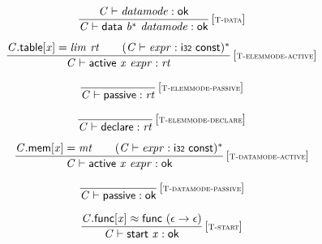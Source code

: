$$
\begin{array}{@{}c@{}}\displaystyle
\frac{
{\mathit{C}} \vdash {\mathit{datamode}} : \mathsf{ok}
}{
{\mathit{C}} \vdash \mathsf{data}~{{\mathit{b}}^\ast}~{\mathit{datamode}} : \mathsf{ok}
} \, {[\textsc{\scriptsize T{-}data}]}
\qquad
\end{array}
$$

$$
\begin{array}{@{}c@{}}\displaystyle
\frac{
{\mathit{C}}.\mathsf{table}{}[{\mathit{x}}] = {\mathit{lim}}~{\mathit{rt}}
 \qquad
({\mathit{C}} \vdash {\mathit{expr}} : \mathsf{i{\scriptstyle32}}~\mathsf{const})^\ast
}{
{\mathit{C}} \vdash \mathsf{active}~{\mathit{x}}~{\mathit{expr}} : {\mathit{rt}}
} \, {[\textsc{\scriptsize T{-}elemmode{-}active}]}
\qquad
\end{array}
$$

$$
\begin{array}{@{}c@{}}\displaystyle
\frac{
}{
{\mathit{C}} \vdash \mathsf{passive} : {\mathit{rt}}
} \, {[\textsc{\scriptsize T{-}elemmode{-}passive}]}
\qquad
\end{array}
$$

$$
\begin{array}{@{}c@{}}\displaystyle
\frac{
}{
{\mathit{C}} \vdash \mathsf{declare} : {\mathit{rt}}
} \, {[\textsc{\scriptsize T{-}elemmode{-}declare}]}
\qquad
\end{array}
$$

$$
\begin{array}{@{}c@{}}\displaystyle
\frac{
{\mathit{C}}.\mathsf{mem}{}[{\mathit{x}}] = {\mathit{mt}}
 \qquad
({\mathit{C}} \vdash {\mathit{expr}} : \mathsf{i{\scriptstyle32}}~\mathsf{const})^\ast
}{
{\mathit{C}} \vdash \mathsf{active}~{\mathit{x}}~{\mathit{expr}} : \mathsf{ok}
} \, {[\textsc{\scriptsize T{-}datamode{-}active}]}
\qquad
\end{array}
$$

$$
\begin{array}{@{}c@{}}\displaystyle
\frac{
}{
{\mathit{C}} \vdash \mathsf{passive} : \mathsf{ok}
} \, {[\textsc{\scriptsize T{-}datamode{-}passive}]}
\qquad
\end{array}
$$

$$
\begin{array}{@{}c@{}}\displaystyle
\frac{
{\mathit{C}}.\mathsf{func}{}[{\mathit{x}}] \approx \mathsf{func}~(\epsilon \rightarrow \epsilon)
}{
{\mathit{C}} \vdash \mathsf{start}~{\mathit{x}} : \mathsf{ok}
} \, {[\textsc{\scriptsize T{-}start}]}
\qquad
\end{array}
$$

